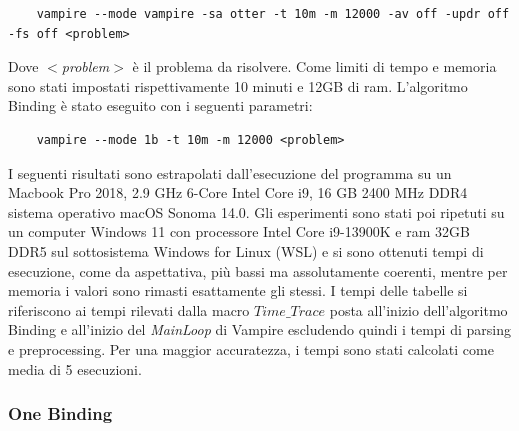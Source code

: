 \documentclass[./main.tex]{subfiles}
\begin{document}
{
\small    
\begin{verbatim}
    vampire --mode vampire -sa otter -t 10m -m 12000 -av off -updr off -fs off <problem>
\end{verbatim}}
Dove \textit{$<$problem$>$} è il problema da risolvere. 
Come limiti di tempo e memoria sono stati impostati rispettivamente 10 minuti e 12GB di ram.
L'algoritmo Binding è stato eseguito con i seguenti parametri:
{
\small    
\begin{verbatim}
    vampire --mode 1b -t 10m -m 12000 <problem>
\end{verbatim}}
I seguenti risultati sono estrapolati dall'esecuzione del programma su un 
Macbook Pro 2018, 2.9 GHz 6-Core Intel Core i9, 16 GB 2400 MHz DDR4 sistema operativo macOS Sonoma 14.0.
Gli esperimenti sono stati poi ripetuti su un computer Windows 11 con processore Intel Core i9-13900K e ram 32GB DDR5
sul sottosistema Windows for Linux (WSL) e si sono ottenuti tempi di esecuzione, come da aspettativa, più bassi ma assolutamente coerenti,
mentre per memoria i valori sono rimasti esattamente gli stessi.
I tempi delle tabelle si riferiscono ai tempi rilevati dalla macro $Time\_Trace$ posta all'inizio dell'algoritmo Binding 
e all'inizio del \textit{MainLoop} di Vampire escludendo quindi i tempi di parsing e preprocessing.
Per una maggior accuratezza, i tempi sono stati calcolati come media di 5 esecuzioni.

\subsubsection{One Binding}

\end{document}
